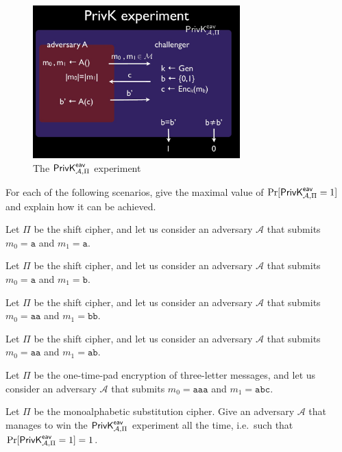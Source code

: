 \documentclass[a4paper,10pt,landscape,twocolumn]{scrartcl}
\begin{document}
\problems

%




\begin{figure}[h]
\center
\includegraphics[width=8cm]{PrivKexperiment.jpg}
\caption{The $\mathsf{PrivK}^{\mathsf{eav}}_{\mathcal{A},\Pi}$ experiment \label{fig:privk-eav}}
\end{figure}

\begin{exercise}
For each of the following scenarios, give the maximal value of $\Pr[\mathsf{PrivK}^{\mathsf{eav}}_{\mathcal{A},\Pi}=1]$ and explain how it can be achieved.

\begin{subex}
Let $\Pi$ be the shift cipher, and let us consider an adversary $\mathcal{A}$ that submits $m_0 = \mathtt{a}$ and $m_1 = \mathtt{a}$. 
\end{subex}

\begin{subex}
Let $\Pi$ be the shift cipher, and let us consider an adversary $\mathcal{A}$ that submits $m_0 = \mathtt{a}$ and $m_1 = \mathtt{b}$. 
\end{subex}

\begin{subex}
Let $\Pi$ be the shift cipher, and let us consider an adversary $\mathcal{A}$ that submits $m_0 = \mathtt{aa}$ and $m_1 = \mathtt{bb}$. 
\end{subex}

\begin{subex}
Let $\Pi$ be the shift cipher, and let us consider an adversary $\mathcal{A}$ that submits $m_0 = \mathtt{aa}$ and $m_1 = \mathtt{ab}$. 
\end{subex}

\begin{subex}
Let $\Pi$ be the one-time-pad encryption of three-letter messages, and let us consider an adversary $\mathcal{A}$ that submits $m_0 = \mathtt{aaa}$ and $m_1 = \mathtt{abc}$. 
\end{subex}

\begin{subex}
Let $\Pi$ be the monoalphabetic substitution cipher. Give an adversary $\mathcal{A}$ that manages to win the $\mathsf{PrivK}^{\mathsf{eav}}_{\mathcal{A},\Pi}$ experiment all the time, i.e.\ such that $\Pr[\mathsf{PrivK}^{\mathsf{eav}}_{\mathcal{A},\Pi}=1] = 1$.
\end{subex}
\end{exercise}
\end{document}
